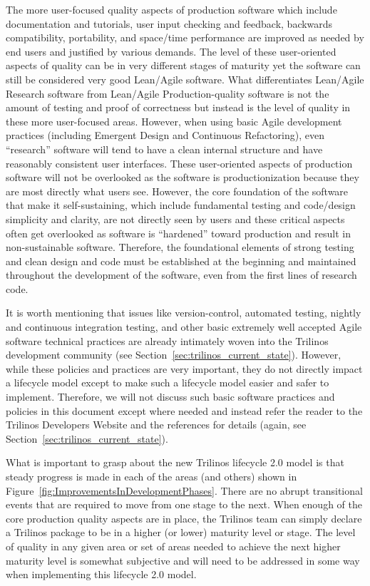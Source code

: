 \documentclass[11pt]{SANDreport}
\begin{document}
The more user-focused quality aspects of production software which
include documentation and tutorials, user input checking and feedback,
backwards compatibility, portability, and space/time performance are
improved as needed by end users and justified by various demands.  The
level of these user-oriented aspects of quality can be in very
different stages of maturity yet the software can still be considered
very good Lean/Agile software.  What differentiates Lean/Agile
Research software from Lean/Agile Production-quality software is not
the amount of testing and proof of correctness but instead is the
level of quality in these more user-focused areas.  However, when
using basic Agile development practices (including Emergent Design and
Continuous Refactoring), even ``research'' software will tend to have
a clean internal structure and have reasonably consistent user
interfaces.  These user-oriented aspects of production software will
not be overlooked as the software is productionization because they
are most directly what users see.  However, the core foundation of the
software that make it self-sustaining, which include fundamental
testing and code/design simplicity and clarity, are not directly seen
by users and these critical aspects often get overlooked as software
is ``hardened'' toward production and result in non-sustainable
software.  Therefore, the foundational elements of strong testing and
clean design and code must be established at the beginning and
maintained throughout the development of the software, even from the
first lines of research code.

It is worth mentioning that issues like version-control, automated
testing, nightly and continuous integration testing, and other basic
extremely well accepted Agile software technical practices are
already intimately woven into the Trilinos development community (see
Section~\ref{sec:trilinos_current_state}).  However, while these
policies and practices are very important, they do not directly
impact a lifecycle model except to make such a lifecycle model easier
and safer to implement.  Therefore, we will not discuss such basic
software practices and policies in this document except where needed
and instead refer the reader to the Trilinos Developers Website and
the references for details (again, see
Section~\ref{sec:trilinos_current_state}).

What is important to grasp about the new Trilinos lifecycle 2.0 model
is that steady progress is made in each of the areas (and others)
shown in Figure~\ref{fig:ImprovementsInDevelopmentPhases}.  There are
no abrupt transitional events that are required to move from one stage
to the next.  When enough of the core production quality aspects are
in place, the Trilinos team can simply declare a Trilinos package to
be in a higher (or lower) maturity level or stage.  The level of
quality in any given area or set of areas needed to achieve the next
higher maturity level is somewhat subjective and will need to be
addressed in some way when implementing this lifecycle 2.0 model.
\end{document}

